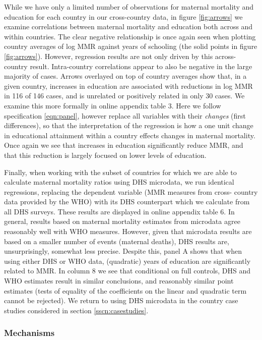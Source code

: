 \documentclass{article}[12pt,subeqn]
\begin{document}
\begin{spacing}{1.4}
While we have only a limited number of observations for maternal
mortality and education for each country in our cross-country data, in figure
\ref{fig:arrows} we examine correlations between maternal mortality and 
education both across and within countries.  The clear negative relationship
is once again seen when plotting country averages of log MMR against years of
schooling (the solid points in figure \ref{fig:arrows}).  However, regression
results are not only driven by this across-country result.  Intra-country
correlations appear to also be negative in the large majority of cases. Arrows
overlayed on top of country averages show that, in a given country, increases
in education are associated with reductions in log MMR in 116 of 146 cases,
and is unrelated or positively related in only 30 cases.  We examine this
more formally in online appendix table 3.  Here we follow
specification \ref{eqn:panel}, however replace all variables with their
\emph{changes} (first differences), so that the interpretation of the regression
is how a one unit change in educational attainment within a country effects
changes in maternal mortality.  Once again we see that increases in education
significantly reduce MMR, and that this reduction is largely focused on
lower levels of education.

Finally, when working with the subset of countries for which we are able to
calculate maternal mortality ratios using DHS microdata, we run identical
regressions, replacing the dependent variable (MMR measures from cross-%
country data provided by the WHO) with its DHS counterpart which we 
calculate from all DHS surveys.  These results are displayed in online
appendix table 6.  In general, results based on maternal mortality estimates
from microdata agree reasonably well with WHO measures.  However, given that
microdata results are based on a smaller number of events (maternal deaths),
DHS results are, unsurprisingly, somewhat less precise.  Despite this, panel
A shows that when using either DHS or WHO data, (quadratic) years of education
are significantly related to MMR.  In column 8 we see that conditional on full
controls, DHS and WHO estimates result in similar conclusions, and reasonably
similar point estimates (tests of equality of the coefficients on the linear
and quadratic term cannot be rejected).  We return to using DHS microdata
in the country case studies considered in section \ref{sscn:casestudies}.

\subsubsection{Mechanisms}

\end{spacing}
\end{document}
